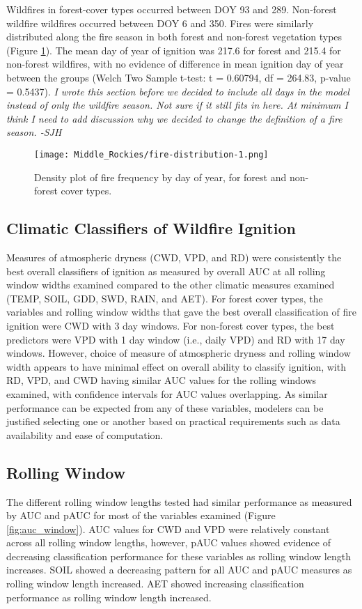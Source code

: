 \documentclass[11pt]{article}
\begin{document}
Wildfires in forest-cover types occurred between DOY 93 and 289.  Non-forest wildfire wildfires occurred between DOY 6 and 350.  Fires were similarly distributed along the fire season in both forest and non-forest vegetation types (Figure \ref{fig:fire-dens}). The mean day of year of ignition was 217.6 for forest and 215.4 for non-forest wildfires, with no evidence of difference in mean ignition day of year between the groups (Welch Two Sample t-test: t = 0.60794, df = 264.83, p-value = 0.5437). \textit{I wrote this section before we decided to include all days in the model instead of only the wildfire season.  Not sure if it still fits in here.  At minimum I think I need to add discussion why we decided to change the definition of a fire season. -SJH}

\begin{figure}[ht]
  \texttt{[image: Middle\_Rockies/fire-distribution-1.png]}
  \caption{Density plot of fire frequency by day of year, for forest and non-forest cover types.}
  \label{fig:fire-dens}
\end{figure}

\subsection{Climatic Classifiers of Wildfire Ignition}

Measures of atmospheric dryness (CWD, VPD, and RD) were consistently the best overall classifiers of ignition as measured by overall AUC at all rolling window widths examined compared to the other climatic measures examined (TEMP, SOIL, GDD, SWD, RAIN, and AET).  For forest cover types, the variables and rolling window widths that gave the best overall classification of fire ignition were CWD with 3 day windows.  For non-forest cover types, the best predictors were VPD with 1 day window (i.e., daily VPD) and RD with 17 day windows.  However, choice of measure of atmospheric dryness and rolling window width appears to have minimal effect on overall ability to classify ignition, with RD, VPD, and CWD having similar AUC values for the rolling windows examined, with confidence intervals for AUC values overlapping.  As similar performance can be expected from any of these variables, modelers can be justified selecting one or another based on practical requirements such as data availability and ease of computation.

\subsection{Rolling Window}
The different rolling window lengths tested had similar performance as measured by AUC and pAUC for most of the variables examined (Figure \ref{fig:auc_window}). AUC values for CWD and VPD were relatively constant across all rolling window lengths, however, pAUC values showed evidence of decreasing classification performance for these variables as rolling window length increases.  SOIL showed a decreasing pattern for all AUC and pAUC measures as rolling window length increased.  AET showed increasing classification performance as rolling window length increased.  
\end{document}
